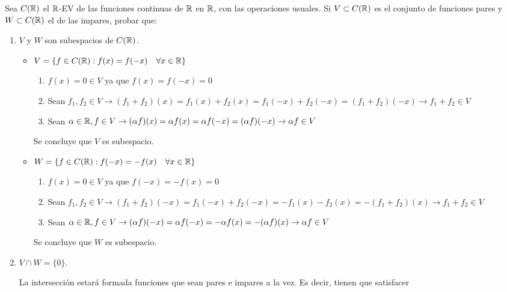 \item Sea $C(\mathbb{R})$ el $\mathbb{R}$-EV de las funciones continuas de $\mathbb{R}$ en $\mathbb{R}$, con las operaciones usuales. Si $V\subset C(\mathbb{R})$ es el conjunto de funciones pares y $W\subset C(\mathbb{R})$ el de las impares, probar que:
    \begin{enumerate}
        \item $V$ y $W$ son subespacios de $C(\mathbb{R})$.
            \begin{mdframed}[style=s]
                \begin{itemize}
                    \item $V=\{f\in C(\mathbb{R}):f(x)=f(-x)\quad\forall x\in\mathbb{R}\}$
                        \begin{enumerate}
                            \item $f(x)=0\in V$ ya que $f(x)=f(-x)=0$
                            \item Sean $f_1,f_2\in V\to (f_1+f_2)(x)=f_1(x)+f_2(x)=f_1(-x)+f_2(-x)=(f_1+f_2)(-x)\to f_1+f_2\in V$
                            \item Sean $\alpha\in\mathbb{R},f\in V\to (\alpha f)(x)=\alpha f(x)=\alpha f(-x)=(\alpha f)(-x)\to\alpha f\in V$
                        \end{enumerate}
                        Se concluye que $V$ es subespacio.
                    \item $W=\{f\in C(\mathbb{R}):f(-x)=-f(x)\quad\forall x\in\mathbb{R}\}$
                        \begin{enumerate}
                            \item $f(x)=0\in V$ ya que $f(-x)=-f(x)=0$
                            \item Sean $f_1,f_2\in V\to (f_1+f_2)(-x)=f_1(-x)+f_2(-x)=-f_1(x)-f_2(x)=-(f_1+f_2)(x)\to f_1+f_2\in V$
                            \item Sean $\alpha\in\mathbb{R},f\in V\to (\alpha f)(-x)=\alpha f(-x)=-\alpha f(x)=-(\alpha f)(x)\to\alpha f\in V$
                        \end{enumerate}
                        Se concluye que $W$ es subespacio.
                \end{itemize}
            \end{mdframed}
        \item $V\cap W=\{0\}$.
            \begin{mdframed}[style=s]
                La intersección estará formada funciones que sean pares e impares a la vez. Es decir, tienen que satisfacer
                \begin{enumerate}

\end{enumerate}
\end{mdframed}
\end{enumerate}
